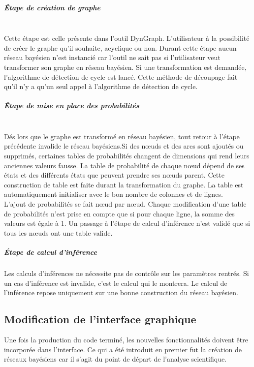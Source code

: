 \documentclass[conference]{IEEEtran}
\begin{document}
\subparagraph{Étape de création de graphe \hfill} \\
Cette étape est celle présente dans l'outil DynGraph. L'utilisateur à la possibilité de créer le graphe qu'il souhaite, acyclique ou non. Durant cette étape aucun réseau bayésien n'est instancié car  l'outil ne sait pas si l'utilisateur veut transformer son graphe en réseau bayésien. Si une transformation est demandée, l'algorithme de détection de cycle est lancé. Cette méthode de découpage fait qu'il n'y a qu'un seul appel à l'algorithme de détection de cycle. \\

\subparagraph{Étape de mise en place des probabilités \hfill}
\\
Dés lors que le graphe est transformé en réseau bayésien, tout retour à l'étape précédente invalide le réseau bayésiens.Si des nœuds et des arcs sont ajoutés ou supprimés, certaines tables de probabilités changent de dimensions qui rend leurs anciennes valeurs fausse. La table de probabilité de chaque nœud dépend de ses états et des différents états que peuvent prendre ses nœuds parent. Cette construction de table est faite durant la transformation du graphe. La table est automatiquement initialiser avec le bon nombre de colonnes et de lignes. \\
L'ajout de probabilités se fait nœud par nœud. Chaque modification d'une table de probabilités n'est prise en compte que si pour chaque ligne, la somme des valeurs est égale à 1. 
Un passage à l'étape de calcul d'inférence n'est validé que si tous les nœuds ont une table valide. \\

\subparagraph{Étape de calcul d'inférence}
Les calculs d'inférences ne nécessite pas de contrôle sur les paramètres rentrés. Si un cas d'inférence est invalide, c'est le calcul qui le montrera. Le calcul de l'inférence repose uniquement sur une bonne construction du réseau bayésien. 


\subsection{Modification de l'interface graphique }

Une fois la production du code terminé, les nouvelles fonctionnalités doivent être incorporée dans l'interface. Ce qui a été introduit en premier fut la création de réseaux bayésiens car il s'agit du point de départ de l'analyse scientifique.
\end{document}
